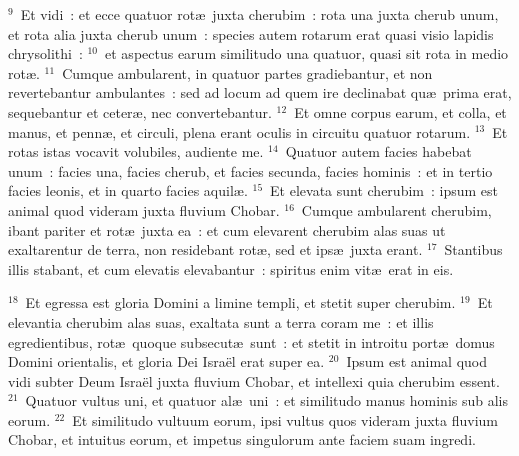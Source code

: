 ${}^{9}$~Et vidi~: et ecce quatuor rot\ae\ juxta cherubim~: rota una juxta cherub unum, et rota alia juxta cherub unum~: species autem rotarum erat quasi visio lapidis chrysolithi~:
${}^{10}$~et aspectus earum similitudo una quatuor, quasi sit rota in medio rot\ae .
${}^{11}$~Cumque ambularent, in quatuor partes gradiebantur, et non revertebantur ambulantes~: sed ad locum ad quem ire declinabat qu\ae\ prima erat, sequebantur et ceter\ae , nec convertebantur.
${}^{12}$~Et omne corpus earum, et colla, et manus, et penn\ae , et circuli, plena erant oculis in circuitu quatuor rotarum.
${}^{13}$~Et rotas istas vocavit volubiles, audiente me.
${}^{14}$~Quatuor autem facies habebat unum~: facies una, facies cherub, et facies secunda, facies hominis~: et in tertio facies leonis, et in quarto facies aquil\ae .
${}^{15}$~Et elevata sunt cherubim~: ipsum est animal quod videram juxta fluvium Chobar.
${}^{16}$~Cumque ambularent cherubim, ibant pariter et rot\ae\ juxta ea~: et cum elevarent cherubim alas suas ut exaltarentur de terra, non residebant rot\ae , sed et ips\ae\ juxta erant.
${}^{17}$~Stantibus illis stabant, et cum elevatis elevabantur~: spiritus enim vit\ae\ erat in eis.


${}^{18}$~Et egressa est gloria Domini a limine templi, et stetit super cherubim.
${}^{19}$~Et elevantia cherubim alas suas, exaltata sunt a terra coram me~: et illis egredientibus, rot\ae\ quoque subsecut\ae\ sunt~: et stetit in introitu port\ae\ domus Domini orientalis, et gloria Dei Isra\"el erat super ea.
${}^{20}$~Ipsum est animal quod vidi subter Deum Isra\"el juxta fluvium Chobar, et intellexi quia cherubim essent.
${}^{21}$~Quatuor vultus uni, et quatuor al\ae\ uni~: et similitudo manus hominis sub alis eorum.
${}^{22}$~Et similitudo vultuum eorum, ipsi vultus quos videram juxta fluvium Chobar, et intuitus eorum, et impetus singulorum ante faciem suam ingredi.

